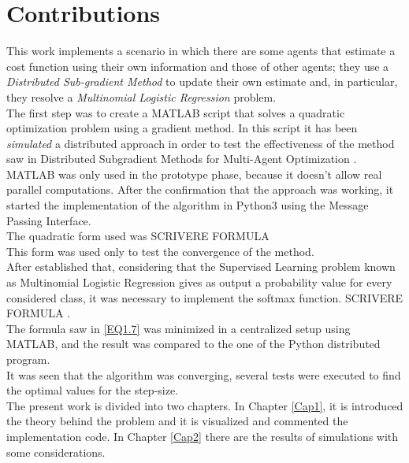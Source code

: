 \documentclass[a4paper,11pt,oneside]{book}
\begin{document}
\section*{Contributions}
This work implements a scenario in which there are some agents that estimate a cost function using their own information and those of other agents; they use a \textit{Distributed Sub-gradient Method} to update their own estimate and, in particular, they resolve a \textit{Multinomial Logistic Regression} problem.\\

The first step was to create a MATLAB script that solves a quadratic optimization problem using a gradient method. In this script it has been \textit{simulated} a distributed approach in order to test the effectiveness of the method saw in Distributed Subgradient Methods for Multi-Agent Optimization \cite{CITATION:1}. MATLAB was only used in the prototype phase, because it doesn't allow real parallel computations. After the confirmation that the approach was working, it started the implementation of the algorithm in Python3 using the Message Passing Interface.\\
The quadratic form used was SCRIVERE FORMULA \\
This form was used only to test the convergence of the method.\\
After established that, considering that the Supervised Learning problem known as Multinomial Logistic Regression gives as output a probability value for every considered class, it was necessary to implement the softmax function. SCRIVERE FORMULA \cite{CITATION:3}. \\
The formula saw in \ref{EQ1.7} was minimized in a centralized setup using MATLAB, and the result was compared to the one of the Python distributed program.\\
It was seen that the algorithm was converging, several tests were executed to find the optimal values for the step-size.\\
The present work is divided into two chapters. In Chapter \ref{Cap1}, it is introduced the theory behind the problem and it is visualized and commented the implementation code. In Chapter \ref{Cap2} there are the results of simulations with some considerations.


\end{document}
